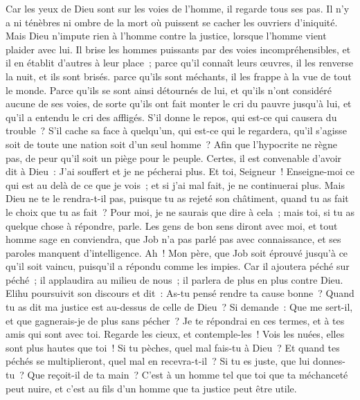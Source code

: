 \begin{multicols}{2}
Car les yeux de Dieu sont sur les voies de l'homme, il regarde tous ses pas.
Il n'y a ni ténèbres ni ombre de la mort où puissent se cacher les ouvriers d'iniquité.
Mais Dieu n'impute rien à l'homme contre la justice, lorsque l'homme vient plaider avec lui. 
Il brise les hommes puissants par des voies incompréhensibles, et il en établit d'autres à leur place~;
parce qu'il connaît leurs œuvres, il les renverse la nuit, et ils sont brisés. 
parce qu'ils sont méchants, il les frappe à la vue de tout le monde.
Parce qu'ils se sont ainsi détournés de lui, et qu'ils n'ont considéré aucune de ses voies,
de sorte qu'ils ont fait monter le cri du pauvre jusqu'à lui, et qu'il a entendu le cri des affligés.
S'il donne le repos, qui est-ce qui causera du trouble~? S'il cache sa face à quelqu'un, qui est-ce qui le regardera, qu'il s'agisse soit de toute une nation soit d'un seul homme~?
Afin que l'hypocrite ne règne pas, de peur qu'il soit un piège pour le peuple.
Certes, il est convenable d'avoir dit à Dieu~: J'ai souffert et je ne pécherai plus.
Et toi, Seigneur~! Enseigne-moi ce qui est au delà de ce que je vois~; et si j'ai mal fait, je ne continuerai plus. 
Mais Dieu ne te le rendra-t-il pas, puisque tu as rejeté son châtiment, quand tu as fait le choix que tu as fait~? Pour moi, je ne saurais que dire à cela~; mais toi, si tu as quelque chose à répondre, parle.
Les gens de bon sens diront avec moi, et tout homme sage en conviendra,
que Job n'a pas parlé pas avec connaissance, et ses paroles manquent d'intelligence.
Ah~! Mon père, que Job soit éprouvé jusqu'à ce qu'il soit vaincu, puisqu'il a répondu comme les impies.
Car il ajoutera péché sur péché~; il applaudira au milieu de nous~; il parlera de plus en plus contre Dieu.
\VerseOne{}Elihu poursuivit son discours et dit~:
As-tu pensé rendre ta cause bonne~? Quand tu as dit ma justice est au-dessus de celle de Dieu~?
Si demande~: Que me sert-il, et que gagnerais-je de plus sans pécher~?
Je te répondrai en ces termes, et à tes amis qui sont avec toi.
Regarde les cieux, et contemple-les~! Vois les nuées, elles sont plus hautes que toi~!
Si tu pèches, quel mal fais-tu à Dieu~? Et quand tes péchés se multiplieront, quel mal en recevra-t-il~?
Si tu es juste, que lui donnes-tu~? Que reçoit-il de ta main~?
C'est à un homme tel que toi que ta méchanceté peut nuire, et c'est au fils d'un homme que ta justice peut être utile.

\end{multicols}
